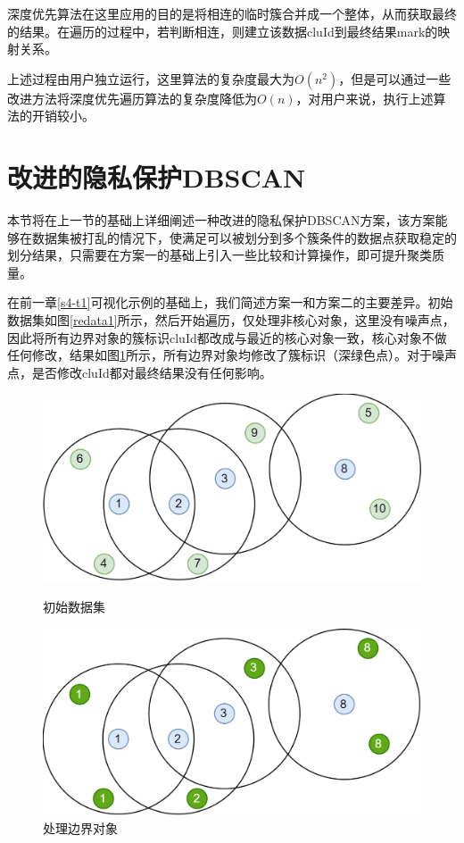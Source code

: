 深度优先算法在这里应用的目的是将相连的临时簇合并成一个整体，从而获取最终的结果。在遍历的过程中，若判断相连，则建立该数据cluId到最终结果mark的映射关系。

上述过程由用户独立运行，这里算法的复杂度最大为$ O(n^2) $，但是可以通过一些改进方法将深度优先遍历算法的复杂度降低为$ O(n) $，对用户来说，执行上述算法的开销较小。

\section{改进的隐私保护DBSCAN}
\label{s4-t2}
本节将在上一节的基础上详细阐述一种改进的隐私保护DBSCAN方案，该方案能够在数据集被打乱的情况下，使满足可以被划分到多个簇条件的数据点获取稳定的划分结果，只需要在方案一的基础上引入一些比较和计算操作，即可提升聚类质量。

在前一章\ref{s4-t1}可视化示例的基础上，我们简述方案一和方案二的主要差异。初始数据集如图\ref{redata1}所示，然后开始遍历，仅处理非核心对象，这里没有噪声点，因此将所有边界对象的簇标识cluId都改成与最近的核心对象一致，核心对象不做任何修改，结果如图\ref{redata2}所示，所有边界对象均修改了簇标识（深绿色点）。对于噪声点，是否修改cluId都对最终结果没有任何影响。

\begin{figure}[!h]
	\begin{minipage}[t]{0.48\linewidth}
		\centering
		\includegraphics[width=\linewidth]{img/db1.png}
		\caption{初始数据集}
		\label{redata1}
	\end{minipage}
	\hfill
	\begin{minipage}[t]{0.48\linewidth}
		\centering
		\includegraphics[width=\linewidth]{img/redbscan.png}
		\caption{处理边界对象}
		\label{redata2}
	\end{minipage}
\end{figure}

